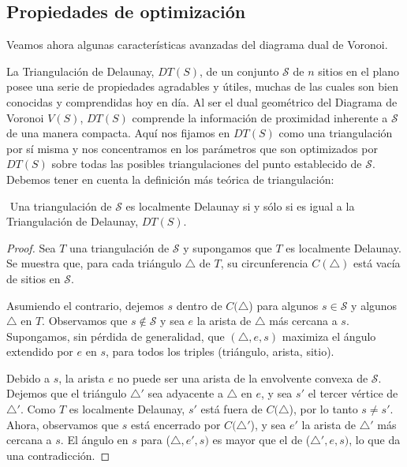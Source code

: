 \subsection{Propiedades de optimización}

Veamos ahora algunas características avanzadas del diagrama dual de Voronoi.
\vspace{0.3cm}

La Triangulación de Delaunay, $DT(S)$, de un conjunto $\mathcal{S}$ de $n$ sitios en el plano posee una serie de propiedades agradables y útiles, muchas de las cuales son bien conocidas y comprendidas hoy en día. Al ser el dual geométrico del Diagrama de Voronoi $V(S)$, $DT(S)$ comprende la información de proximidad inherente a $\mathcal{S}$ de una manera compacta. Aquí nos fijamos en $DT(S)$ como una triangulación por sí misma y nos concentramos en los parámetros que son optimizados por $DT(S)$ sobre todas las posibles triangulaciones del punto establecido de $\mathcal{S}$. Debemos tener en cuenta la definición más teórica de triangulación:

\vspace{0.3cm}

\begin{teorema}$\label{th32}$
    Una triangulación de $\mathcal{S}$ es localmente Delaunay si y sólo si es igual a la Triangulación de Delaunay, $DT(S)$.
\end{teorema}

\begin{proof}
    Sea $T$ una triangulación de $\mathcal{S}$ y supongamos que $T$ es localmente Delaunay. Se muestra que, para cada triángulo $\bigtriangleup$ de $T$, su circunferencia $C(\bigtriangleup)$ está vacía de sitios en $\mathcal{S}$.
    
    Asumiendo el contrario, dejemos $s$ dentro de $C(\bigtriangleup$) para algunos $s \in{\mathcal{S}}$ y algunos $\bigtriangleup$ en $T$. Observamos que $s \notin{\mathcal{S}}$ y sea $e$ la arista de $\bigtriangleup$ más cercana a $s$. Supongamos, sin pérdida de generalidad, que $(\bigtriangleup,e,s)$ maximiza el ángulo extendido por $e$ en $s$, para todos los triples (triángulo, arista, sitio).
    
    Debido a $s$, la arista $e$ no puede ser una arista de la envolvente convexa de $\mathcal{S}$. Dejemos que el triángulo $\bigtriangleup'$ sea adyacente a $\bigtriangleup$ en $e$, y sea $s'$ el tercer vértice de $\bigtriangleup'$. Como $T$ es localmente Delaunay, $s'$ está fuera de $C(\bigtriangleup$), por lo tanto $s \neq s'$. Ahora, observamos que $s$ está encerrado por $C(\bigtriangleup'$), y sea $e'$ la arista de $\bigtriangleup'$ más cercana a $s$. El ángulo en $s$ para ($\bigtriangleup,e',s)$ es mayor que el de ($\bigtriangleup',e,s)$, lo que da una contradicción.
\end{proof}
\vspace{0.3cm}

